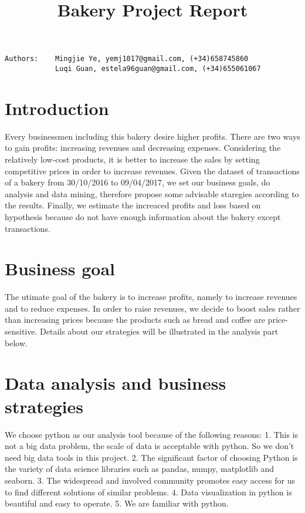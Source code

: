 \documentclass[11pt]{article}
\title{Bakery Project Report}
\begin{document}
    
    
    \maketitle
    
    

    
    \begin{verbatim}
Authors:    Mingjie Ye, yemj1017@gmail.com, (+34)658745860
            Luqi Guan, estela96guan@gmail.com, (+34)655061067
\end{verbatim}

\hypertarget{introduction}{%
\section{Introduction}\label{introduction}}

Every businessmen including this bakery desire higher profits. There are
two ways to gain profits: increasing revenues and decreasing expenses.
Considering the relatively low-cost products, it is better to increase
the sales by setting competitive prices in order to increase revenues.
Given the dataset of transactions of a bakery from 30/10/2016 to
09/04/2017, we set our business goals, do analysis and data mining,
therefore propose some advisable staregies according to the results.
Finally, we estimate the increaced profits and loss based on hypothesis
because do not have enough information about the bakery except
transactions.

    \hypertarget{business-goal}{%
\section{Business goal}\label{business-goal}}

The utimate goal of the bakery is to increase profits, namely to
increase revenues and to reduce expenses. In order to raise revenues, we
decide to boost sales rather than increasing prices because the products
such as bread and coffee are price-sensitive. Details about our
strategies will be illustrated in the analysis part below.

    \hypertarget{data-analysis-and-business-strategies}{%
\section{Data analysis and business
strategies}\label{data-analysis-and-business-strategies}}

We choose python as our analysis tool because of the following reasons:
1. This is not a big data problem, the scale of data is acceptable with
python. So we don't need big data tools in this project. 2. The
significant factor of choosing Python is the variety of data science
libraries such as pandas, numpy, matplotlib and seaborn. 3. The
widespread and involved community promotes easy access for us to find
different solutions of similar problems. 4. Data visualization in python
is beautiful and easy to operate. 5. We are familiar with python.
\end{document}
